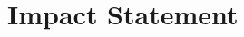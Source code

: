 \documentclass[12pt,a4paper,twoside]{book}
\begin{document}
%

\chapter*{Impact Statement}
\thispagestyle{empty}

%
\end{document}
